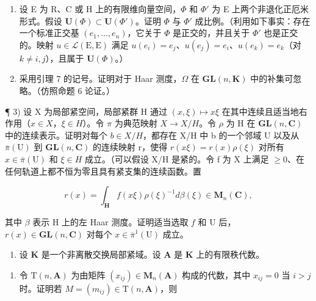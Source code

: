 \exercisesection{}

\begin{enumerate}
\def\labelenumi{\arabic{enumi})}
\item
  设 E 为 R、C 或 H 上的有限维向量空间，\(\Phi\) 和 \(\Phi'\) 为 E 上两个非退化正厄米形式。假设 \(\mathbf{U}(\Phi) \subset \mathbf{U}(\Phi')\)。证明 \(\Phi\) 与 \(\Phi'\) 成比例。（利用如下事实：存在一个标准正交基 \((e_{1}, \ldots, e_{n})\)，它关于 \(\Phi\) 是正交的，并且关于 \(\Phi'\) 也是正交的。映射 \(u \in \mathcal{L}(\mathrm{E}, \mathrm{E})\) 满足 \(u(e_{i}) = e_{j}\)、\(u(e_{j}) = e_{i}\)、\(u(e_{k}) = e_{k}\)（对 \(k \neq i, j\)），且属于 \(\mathbf{U}(\Phi)\)。）
\item
  采用引理 7 的记号。证明对于 Haar 测度，\(\Omega\) 在 \(\mathbf{GL}(n,\mathbf{K})\) 中的补集可忽略。（仿照命题 6 论证。）
\end{enumerate}

¶ 3) 设 X 为局部紧空间，局部紧群 H 通过 \((x,\xi)\mapsto x\xi\) 在其中连续且适当地右作用（\(x\in X\)，\(\xi\in H\)）。令 \(\pi\) 为典范映射 \(X\to X/H\)。令 \(\rho\) 为 H 在 \(\mathbf{GL}(n,\mathbf{C})\) 中的连续表示。证明对每个 \(b\in X/H\)，都存在 X/H 中 b 的一个邻域 U 以及从 \(\overline{\pi}(\mathrm{U})\) 到 \(\mathbf{GL}(n,\mathbf{C})\) 的连续映射 r，使得 \(r(x\xi)=r(x)\rho(\xi)\) 对所有 \(x\in\overline{\pi}(\mathrm{U})\) 和 \(\xi\in H\) 成立。（可以假设 X/H 是紧的。令 f 为 X 上满足 \(\geqslant0\)、在任何轨道上都不恒为零且具有紧支集的连续函数。置

\[
r (x) = \int_ {\mathbf {H}} f (x \xi) \rho (\xi) ^ {- 1} d \beta (\xi) \in \mathbf {M} _ {n} (\mathbf {C}),
\]

其中 \(\beta\) 表示 H 上的左 Haar 测度。证明适当选取 \(f\) 和 U 后，\(r(x) \in \mathbf{GL}(n, \mathbf{C})\) 对每个 \(x \in \overline{\pi}^1(\mathrm{U})\) 成立。

\begin{enumerate}
\def\labelenumi{\arabic{enumi})}
\setcounter{enumi}{3}
\tightlist
\item
  设 \(\mathbf{K}\) 是一个非离散交换局部紧域。设 \(\mathbf{A}\) 是 \(\mathbf{K}\) 上的有限秩代数。
\end{enumerate}

\begin{enumerate}
\def\labelenumi{\alph{enumi})}
\tightlist
\item
  令 \(\mathrm{T}(n, \mathbf{A})\) 为由矩阵 \((x_{ij}) \in \mathbf{M}_n(\mathbf{A})\) 构成的代数，其中 \(x_{ij} = 0\) 当 \(i > j\) 时。证明若 \(M = (m_{ij}) \in \mathrm{T}(n, \mathbf{A})\)，则
\end{enumerate}

